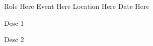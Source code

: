 

\begin{cventries}

  \cventry
    {Role Here} %
    {Event Here} %
    {Location Here} %
    {Date Here} %
    {
      \begin{cvitems} %
        \item {Desc 1}
        \item {Desc 2}
      \end{cvitems}
    }

\end{cventries}
